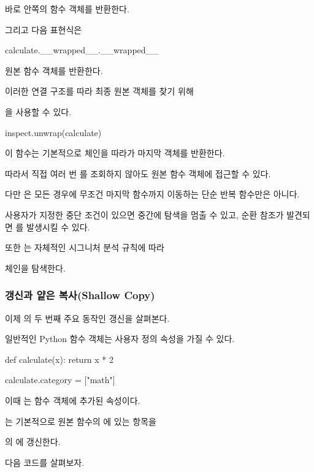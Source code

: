 바로 안쪽의  함수 객체를 반환한다.

그리고 다음 표현식은

\begin{dhkcode}
calculate.__wrapped__.__wrapped__
\end{dhkcode}

원본 함수 객체를 반환한다.

이러한 연결 구조를 따라 최종 원본 객체를 찾기 위해 

을 사용할 수 있다.

\begin{dhkcode}
inspect.unwrap(calculate)
\end{dhkcode}

이 함수는 기본적으로  체인을 따라가 마지막 객체를 반환한다.

따라서 직접 여러 번 를 조회하지 않아도 원본 함수 객체에 접근할 수 있다.

다만 은 모든 경우에 무조건 마지막 함수까지 이동하는 단순 반복 함수만은 아니다.

사용자가 지정한 중단 조건이 있으면 중간에 탐색을 멈출 수 있고, 순환 참조가 발견되면 를 발생시킬 수 있다.

또한 는 자체적인 시그니처 분석 규칙에 따라 

 체인을 탐색한다.

\subsubsection{ 갱신과 얕은 복사(Shallow Copy)}

이제 의 두 번째 주요 동작인  갱신을 살펴본다.

일반적인 Python 함수 객체는 사용자 정의 속성을 가질 수 있다.

\begin{dhkcode}
def calculate(x):
    return x * 2

calculate.category = ["math"]
\end{dhkcode}

이때 는 함수 객체에 추가된 속성이다.

는 기본적으로 원본 함수의 에 있는 항목을 

의 에 갱신한다.

다음 코드를 살펴보자.

